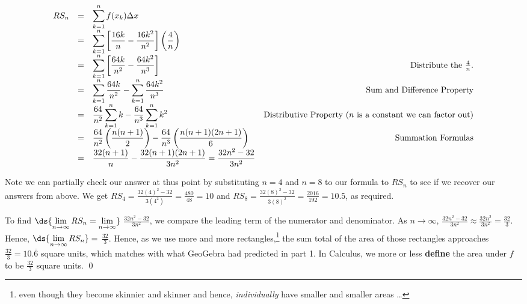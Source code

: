 \documentclass{ximera}
\begin{document}
\begin{example}
\begin{enumerate}
\[\begin{array}{rclr}
RS_{n} & = & \displaystyle{ \sum_{k=1}^{n} f(x_{k}) \Delta x} & \\  
            & = & \displaystyle{ \sum_{k=1}^{n} \left[\frac{16k}{n} - \frac{16k^2}{n^2} \right] \left( \frac{4}{n} \right)} & \\  
             & = & \displaystyle{ \sum_{k=1}^{n} \left[\frac{64k}{n^2} - \frac{64k^2}{n^3} \right]} & \text{Distribute the $ \frac{4}{n}$.}  \\  
             & = & \displaystyle{ \sum_{k=1}^{n} \frac{64k}{n^2}  - \sum_{k=1}^{n} \frac{64k^2}{n^3} } & \text{Sum and Difference Property} \\  
            & = & \displaystyle{ \frac{64}{n^2} \sum_{k=1}^{n} k  - \frac{64}{n^3} \sum_{k=1}^{n} k^2 } & \text{Distributive Property (} n \text{ is a constant we can factor out)}\\  
            & = & \displaystyle{ \frac{64}{n^2} \left( \frac{n(n+1)}{2} \right) - \frac{64}{n^3}\left( \frac{n(n+1)(2n+1)}{6} \right) } & \text{Summation Formulas} \\  
          & = & \displaystyle{\frac{32(n+1)}{n}  - \frac{32(n+1)(2n+1)}{3n^2} =  \frac{32n^2-32}{3n^2}}&  \\  
 \end{array}\] %
 
 Note we can partially check our answer at thus point by substituting $n=4$ and $n=8$ to our formula to $RS_{n}$ to see if we recover our answers from above.  We get $RS_{4} = \frac{32(4)^2 - 32}{3(4^2)}= \frac{480}{48} = 10$ and $RS_{8} = \frac{32(8)^2 - 32}{3(8)^2} = \frac{2016}{192} = 10.5$, as required.
 
To find  $\ds{\lim_{n \rightarrow \infty} RS_{n}=\lim_{n \rightarrow \infty}}$  $\frac{32n^2-32}{3n^2}$, we compare the leading term of the numerator and denominator.  As $n \rightarrow \infty$, $\frac{32n^2-32}{3n^2} \approx \frac{32n^2}{3n^2} = \frac{32}{3}$.  Hence, $\ds{\lim_{n \rightarrow \infty} RS_{n}}=$  $\frac{32}{3}$.  Hence, as we use more and more rectangles,\footnote{even though they become skinnier and skinner and hence, \textit{individually} have smaller and smaller areas \ldots} the sum total of the area of those rectangles approaches $\frac{32}{3} = 10.\overline{6}$ square units, which matches with what GeoGebra had predicted in part 1.  In  Calculus, we more or less  \textbf{define} the area under $f$ to be $\frac{32}{3}$ square units. \qed

\end{enumerate}

\end{example}
\end{document}
